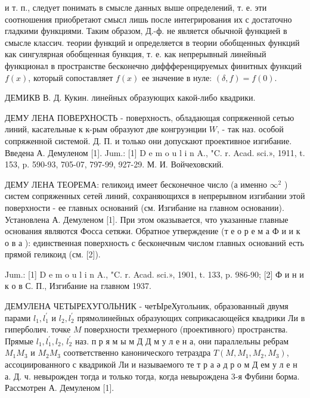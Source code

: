 \documentclass[10pt]{article}
\begin{document}
и т. п., следует понимать в смысле данных выше определений, т. е. эти соотношения приобретают смысл лишь после интегрирования их с достаточно гладкими функциями. Таким образом, Д.-ф. не является обычной функцией в смысле классич. теории функций и определяется в теории обобщенных функций как сингулярная обобщенная бункция, т. е. как непрерывный линейный функционал в пространстве бесконечно диффференцируемых финитных функций $f(x)$, который сопоставляет $f(x)$ ее значение в нуле: $(\delta, f)=f(0)$.



ДЕМИКВ В. Д. Кукин. линейных образующих какой-либо квадрики.



ДЕМУ ЛЕНА ПОВЕРХНОСТЬ - поверхность, обладающая сопряженной сетью линий, касательные к к-рым образуют две конгруэнции $W$, - так наз. особой сопряженной системой. Д. П. и только они допускают проективное изгибание. Введена А. Демуленом [1]. Jum.: [1] D e m o u l i n A., "C. r. Acad. sci.», 1911, t. 153, p. 590-93, 705-07, 797-99, 927-29. М. И. Войчеховский.



ДЕМУ ЛЕНА ТЕОРЕМА: геликоид имеет бесконечное число (а именно $\infty^{2}$ ) систем сопряженных сетей линий, сохраняющихся в непрерывном изгибании этой поверхности - ее главных оснований (см. Изгибание на главном основании). Установлена А. Демуленом [1]. При этом оказывается, что указанные главные основания являются Фосса сетяжи. Обратное утверждение (т е о р е м а Ф и и к о в а ): единственная поверхность с бесконечным числом главных оснований есть прямой геликоид (см. [2]).



Jum.: [1] D e m o u l i n A., "C. r. Acad. sci.», 1901, t. 133, p. 986-90; [2] Ф и н и к о в С. П., Изгибание на главном 1937.



ДЕМУЛЕНА ЧЕТЫРЕХУГОЛЬНИК - четЫреХугольник, образованный двумя парами $l_{1}, l_{1}^{\prime}$ и $l_{2}, l_{2}^{\prime}$ прямолинейных образующих соприкасающейся квадрики Ли в гиперболич. точке $M$ поверхности трехмерного (проективного) пространства. Прямые $l_{1}, l_{1}^{\prime}, l_{2}$, $l_{2}^{\prime}$ наз. п р я м ы м Д Д м у л е н а, они параллельны ребрам $M_{1} M_{3}$ и $M_{2} M_{3}$ соответственно канонического тетраздра $T\left(M, M_{1}, M_{2}, M_{3}\right)$, ассоциированного с квадрикой Ли и называемого те т р а ә д р о м Д ем у л е н а. Д. ч. невырожден тогда и только тогда, когда невырождена 3-я Фубини борма. Рассмотрен А. Демуленом [1].
\end{document}
